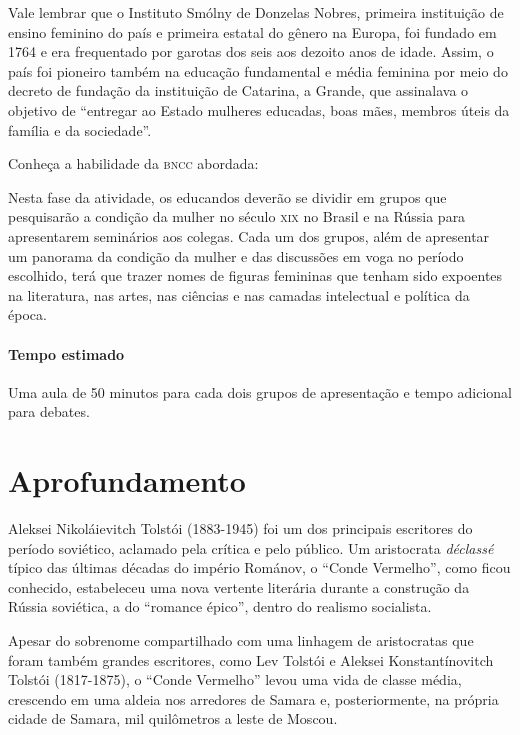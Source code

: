 \documentclass[11pt]{extarticle}
\begin{document}
Vale lembrar que o Instituto Smólny de Donzelas Nobres, primeira
instituição de ensino feminino do país e primeira estatal do gênero na
Europa, foi fundado em 1764 e era frequentado por garotas dos seis aos
dezoito anos de idade. Assim, o país foi pioneiro também na educação
fundamental e média feminina por meio do decreto de fundação da
instituição de Catarina, a Grande, que assinalava o objetivo de
``entregar ao Estado mulheres educadas, boas mães, membros úteis da
família e da sociedade''.


Conheça a habilidade da \textsc{bncc} abordada:


Nesta fase da atividade, os educandos deverão se dividir em grupos que
pesquisarão a condição da mulher no século \textsc{xix} no Brasil e na Rússia
para apresentarem seminários aos colegas. Cada um dos grupos, além de
apresentar um panorama da condição da mulher e das discussões em voga no
período escolhido, terá que trazer nomes de figuras femininas que tenham
sido expoentes na literatura, nas artes, nas ciências e nas camadas
intelectual e política da época.

\paragraph{Tempo estimado} Uma aula de 50 minutos para cada dois grupos de
apresentação e tempo adicional para debates.

\section{Aprofundamento}

Aleksei Nikoláievitch Tolstói
(1883-1945) foi um dos principais escritores do período soviético,
aclamado pela crítica e pelo público. Um aristocrata \emph{déclassé}
típico das últimas décadas do império Románov, o ``Conde Vermelho'',
como ficou conhecido, estabeleceu uma nova vertente literária durante a
construção da Rússia soviética, a do ``romance épico'', dentro do
realismo socialista.


Apesar do sobrenome compartilhado com uma linhagem de aristocratas que
foram também grandes escritores, como Lev Tolstói e Aleksei
Konstantínovitch Tolstói (1817-1875), o ``Conde Vermelho'' levou uma
vida de classe média, crescendo em uma aldeia nos arredores de Samara e,
posteriormente, na própria cidade de Samara, mil quilômetros a leste de
Moscou.
\end{document}

